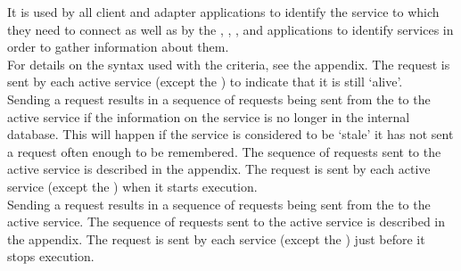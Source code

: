 It is used by all client and adapter applications to identify the service to which they
need to connect as well as by the ,
, ,
 and \emph{\MMMU} applications to identify services in
order to gather information about them.\\

For details on the syntax used with the criteria, see the 
 appendix.
The  request is sent by each active service
(except the ) to indicate that it is still `alive'.\\

Sending a  request results in a sequence of
requests being sent from the  to the active service if
the information on the service is no longer in the internal database.
This will happen if the service is considered to be `stale' \longDash{} it has not sent a
 request often enough to be remembered.
The sequence of requests sent to the active service is described in the 
 appendix.
The  request is sent by each active service
(except the ) when it starts execution.\\

Sending a  request results in a sequence of
requests being sent from the  to the active service.
The sequence of requests sent to the active service is described in the 
 appendix.
The  request is sent by each service
(except the ) just before it stops execution.\\

